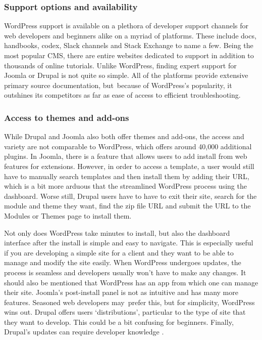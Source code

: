 \documentclass[fontsize=10pt]{extarticle}
\numberwithin{figure}{section} %
\begin{document}
\hypertarget{support-options-and-availability}{%
\subsubsection{Support options and
availability~}\label{support-options-and-availability}}

WordPress support is available on a plethora of developer support
channels for web developers and beginners alike on a myriad of
platforms. These include docs, handbooks, codex, Slack channels and
Stack Exchange to name a few. Being the most popular CMS, there are
entire websites dedicated to support in addition to thousands of online
tutorials. Unlike WordPress, finding expert support for Joomla or Drupal
is not quite so simple. All of the platforms provide extensive primary
source documentation, but~because of WordPress's popularity, it
outshines its competitors as far as ease of access to efficient
troubleshooting.~

\hypertarget{access-to-themes-and-add-ons}{%
\subsubsection{Access to themes and
add-ons~}\label{access-to-themes-and-add-ons}}

While Drupal and Joomla also both offer themes and add-ons, the access
and variety are not comparable to WordPress, which offers around 40,000
additional plugins. In Joomla, there is a feature that allows users to
add install from web features for extensions. However, in order to
access a template, a user would still have to manually search templates
and then install them by adding their URL, which is a bit more arduous
that the streamlined WordPress process using the dashboard. Worse still,
Drupal users have to have to exit their site, search for the module and
theme they want, find the zip file URL and submit the URL to the Modules
or Themes page to install them.~

Not only does WordPress take minutes to install, but also the dashboard
interface after the install is simple and easy to navigate. This is
especially useful if you are developing a simple site for a client and
they want to be able to manage and modify the site easily. When
WordPress undergoes updates, the process is seamless and developers
usually won't have to make any changes. It should also be mentioned that
WordPress has an app from which one can manage their site. Joomla's
post-install panel is not as intuitive and has many more features.
Seasoned web developers may~prefer this, but for simplicity, WordPress
wins out. Drupal offers users `distributions', particular to the type of
site that they want to develop. This could be a bit confusing for
beginners. Finally, Drupal's updates can require developer knowledge
\cite{p2} \cite{p3} \cite{p4} .
\end{document}
